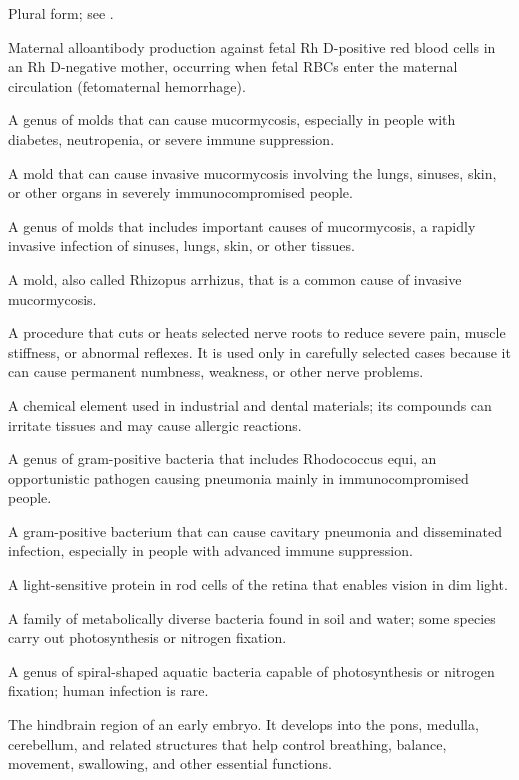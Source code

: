  Plural form; see .

 Maternal alloantibody production against fetal Rh D-positive red blood cells in an Rh
D-negative mother, occurring when fetal RBCs enter the maternal circulation
(fetomaternal hemorrhage).

 A genus of molds that can cause mucormycosis, especially in people with diabetes, neutropenia, or severe immune suppression.

 A mold that can cause invasive mucormycosis involving the lungs, sinuses, skin, or other organs in severely immunocompromised people.

 A genus of molds that includes important causes of mucormycosis, a rapidly invasive infection of sinuses, lungs, skin, or other tissues.

 A mold, also called Rhizopus arrhizus, that is a common cause of invasive mucormycosis.

 A procedure that cuts or heats selected nerve roots to reduce severe pain, muscle stiffness, or abnormal reflexes. It is used only in carefully selected cases because it can cause permanent numbness, weakness, or other nerve problems.

 A chemical element used in industrial and dental materials; its compounds can irritate tissues and may cause allergic reactions.

 A genus of gram-positive bacteria that includes Rhodococcus equi, an opportunistic pathogen causing pneumonia mainly in immunocompromised people.

 A gram-positive bacterium that can cause cavitary pneumonia and disseminated infection, especially in people with advanced immune suppression.

 A light-sensitive protein in rod cells of the retina that enables vision in dim light.

 A family of metabolically diverse bacteria found in soil and water; some species carry out photosynthesis or nitrogen fixation.

 A genus of spiral-shaped aquatic bacteria capable of photosynthesis or nitrogen fixation; human infection is rare.

 The hindbrain region of an early embryo. It develops into the pons, medulla, cerebellum, and related structures that help control breathing, balance, movement, swallowing, and other essential functions.

